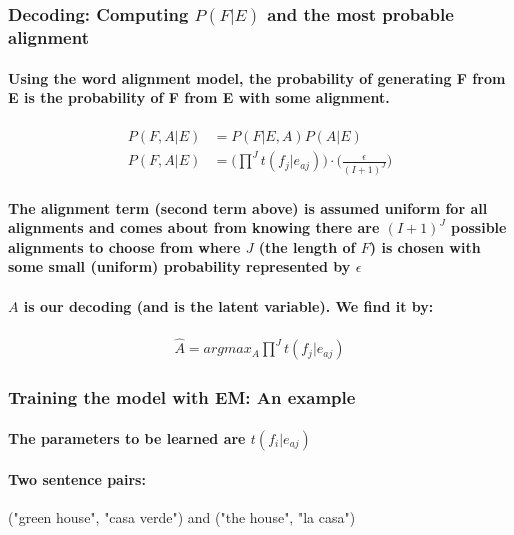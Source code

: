 \documentclass[]{article}
\begin{document}
\subsubsection{Decoding: Computing $P(F|E)$ and the most probable alignment}
\paragraph{Using the word alignment model, the probability of generating F from E is the probability of F from E with some alignment.}	
\begin{align}
P(F,A|E) &= P(F|E,A) P(A|E) \\
P(F,A|E) &= \big( \prod^J t(f_j|e_{aj}) \big) \cdot \big( \frac{\epsilon}{(I+1)^J} \big)
\end{align}
\paragraph{The alignment term (second term above) is assumed uniform for all alignments and comes about from knowing there are $(I+1)^J$ possible alignments to choose from where $J$ (the length of $F$) is chosen with some small (uniform)  probability represented by $\epsilon$}
\paragraph{$A$ is our decoding (and is the latent variable). We find it by:}
\begin{align}
\hat A = argmax_A \prod^J t(f_j|e_{aj})
\end{align}
\newpage
\subsubsection{Training the model with EM: An example}
\paragraph{The parameters to be learned are $t(f_i|e_{aj})$}
\paragraph{Two sentence pairs:\\}
("green house", "casa verde") and ("the house", "la casa")
\end{document}
